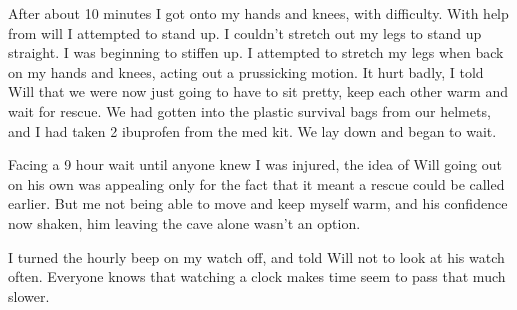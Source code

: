     After about 10 minutes I got onto my hands and knees, with difficulty. With help from will I attempted to stand up. I couldn’t stretch out my legs to stand up straight. I was beginning to stiffen up. I attempted to stretch my legs when back on my hands and knees, acting out a prussicking motion. It hurt badly, I told Will that we were now just going to have to sit pretty, keep each other warm and wait for rescue. We had gotten into the plastic survival bags from our helmets, and I had taken 2 ibuprofen from the med kit. We lay down and began to wait.

    Facing a 9 hour wait until anyone knew I was injured, the idea of Will going out on his own was appealing only for the fact that it meant a rescue could be called earlier. But me not being able to move and keep myself warm, and his confidence now shaken, him leaving the cave alone wasn’t an option.

    I turned the hourly beep on my watch off, and told Will not to look at his watch often. Everyone knows that watching a clock makes time seem to pass that much slower.

